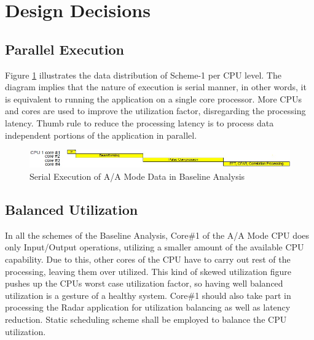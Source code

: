 \section{Design Decisions}
\label{mm:design_decisions}

\subsection{Parallel Execution}
Figure \ref{fig:mm:aa_serial_exe} illustrates the data distribution of Scheme-1 per CPU level. The diagram implies that the nature of execution is serial manner, in other words, it is equivalent to running the application on a single core processor. More CPUs and cores are used to improve the utilization factor, disregarding the processing latency. Thumb rule to reduce the processing latency is to process data independent portions of the application in parallel. 

\begin{figure}[h!]
	\centering
	\includegraphics[width=160mm]{figures/aa_serial_exe}
	\caption{Serial Execution of A/A Mode Data in Baseline Analysis}
	\label{fig:mm:aa_serial_exe}
\end{figure}

\subsection{Balanced Utilization}
In all the schemes of the Baseline Analysis, Core\#1 of the A/A Mode CPU does only Input/Output operations, utilizing a smaller amount of the available CPU capability. Due to this, other cores of the CPU have to carry out rest of the processing, leaving them over utilized. This kind of skewed utilization figure pushes up the CPUs worst case utilization factor, so having well balanced utilization is a gesture of a healthy system. Core\#1 should also take part in processing the Radar application for utilization balancing as well as latency reduction. Static scheduling scheme shall be employed to balance the CPU utilization. \vspace*{0.2cm}

